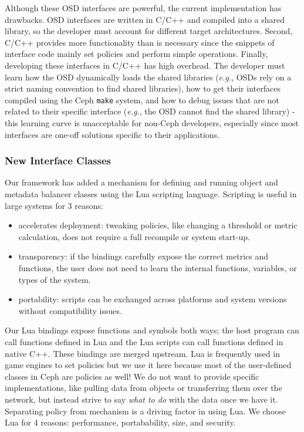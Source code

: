 \documentclass[10pt,twocolumn]{article}
\begin{document}
Although these OSD interfaces are powerful, the current implementation
has drawbacks. OSD interfaces are written in C/C++ and compiled into a
shared library, so the developer must account for different target
architectures. Second, C/C++ provides more functionality than is
necessary since the snippets of interface code mainly set policies and
perform simple operations. Finally, developing these interfaces in C/C++
has high overhead. The developer must learn how the OSD dynamically
loads the shared libraries (\emph{e.g.}, OSDs rely on a strict naming
convention to find shared libraries), how to get their interfaces
compiled using the Ceph \texttt{make} system, and how to debug issues
that are not related to their specific interface (\emph{e.g.}, the OSD
cannot find the shared library) - this learning curve is unacceptable
for non-Ceph developers, especially since most interfaces are one-off
solutions specific to their applications.

\subsubsection{New Interface Classes}\label{new-interface-classes}

Our framework has added a mechanism for defining and running object and
metadata balancer classes using the Lua scripting language. Scripting is
useful in large systems for 3 reasons:

\begin{itemize}
\item
  accelerates deployment: tweaking policies, like changing a threshold
  or metric calculation, does not require a full recompile or system
  start-up.
\item
  transparency: if the bindings carefully expose the correct metrics and
  functions, the user does not need to learn the internal functions,
  variables, or types of the system.
\item
  portability: scripts can be exchanged across platforms and system
  versions without compatibility issues.
\end{itemize}

Our Lua bindings expose functions and symbols both ways; the host
program can call functions defined in Lua and the Lua scripts can call
functions defined in native C++. These bindings are merged upstream. Lua
is frequently used in game engines to set policies but we use it here
because most of the user-defined classes in Ceph are policies as well!
We do not want to provide specific implementations, like pulling data
from objects or transferring them over the network, but instead strive
to say \emph{what to do} with the data once we have it. Separating
policy from mechanism is a driving factor in using Lua. We choose Lua
for 4 reasons: performance, portabability, size, and security.
\end{document}
